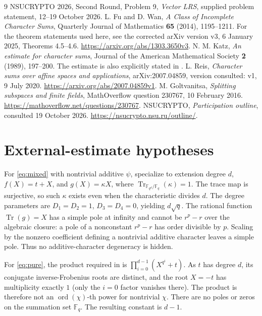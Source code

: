 \documentclass[11pt,a4paper]{article}
\theoremstyle{definition}\newtheorem{definition}[theorem]{Definition}
\theoremstyle{remark}\newtheorem{remark}[theorem]{Remark}
\newcommand{\F}{\mathbb F}
\newcommand{\Tr}{\operatorname{Tr}}
\newcommand{\ord}{\operatorname{ord}}
\numberwithin{equation}{section}
\begin{document}
\begin{thebibliography}{9}
 NSUCRYPTO 2026, Second Round, Problem 9, \emph{Vector LRS}, supplied problem statement, 12--19 October 2026.
 L. Fu and D. Wan, \emph{A Class of Incomplete Character Sums}, Quarterly Journal of Mathematics \textbf{65} (2014), 1195--1211. For the theorem statements used here, see the corrected arXiv version v3, 6 January 2025, Theorems 4.5--4.6. \url{https://arxiv.org/abs/1303.3650v3}.
 N. M. Katz, \emph{An estimate for character sums}, Journal of the American Mathematical Society \textbf{2} (1989), 197--200. The estimate is also explicitly stated in \cite[Theorem 2.6]{reis}.
 L. Reis, \emph{Character sums over affine spaces and applications}, arXiv:2007.04859, version consulted: v1, 9 July 2020. \url{https://arxiv.org/abs/2007.04859v1}.
 M. Goltvanitsa, \emph{Splitting subspaces and finite fields}, MathOverflow question 230767, 10 February 2016. \url{https://mathoverflow.net/questions/230767}.
 NSUCRYPTO, \emph{Participation outline}, consulted 19 October 2026. \url{https://nsucrypto.nsu.ru/outline/}.
\end{thebibliography}

\clearpage
\appendix
\section{External-estimate hypotheses}\label{app:external}
For \eqref{eq:mixed} with nontrivial additive $\psi$, specialize \cite[Theorem 4.6, v3]{fuwan} to extension degree $d$, $f(X)=t+X$, and $g(X)=\kappa X$, where $\Tr_{\F_{q^d}/\F_q}(\kappa)=1$. The trace map is surjective, so such $\kappa$ exists even when the characteristic divides $d$. The degree parameters are $D_1=D_2=1$, $D_3=D_4=0$, yielding $d\sqrt q$. The rational function $\Tr(g)=X$ has a simple pole at infinity and cannot be $r^p-r$ over the algebraic closure: a pole of a nonconstant $r^p-r$ has order divisible by $p$. Scaling by the nonzero coefficient defining a nontrivial additive character leaves a simple pole. Thus no additive-character degeneracy is hidden.

For \eqref{eq:pure}, the product required in \cite[Theorem 4.5]{fuwan} is $\prod_{i=0}^{d-1}(X^{q^i}+t)$. As $t$ has degree $d$, its conjugate inverse-Frobenius roots are distinct, and the root $X=-t$ has multiplicity exactly $1$ (only the $i=0$ factor vanishes there). The product is therefore not an $\ord(\chi)$-th power for nontrivial $\chi$. There are no poles or zeros on the summation set $\F_q$. The resulting constant is $d-1$.
\end{document}

